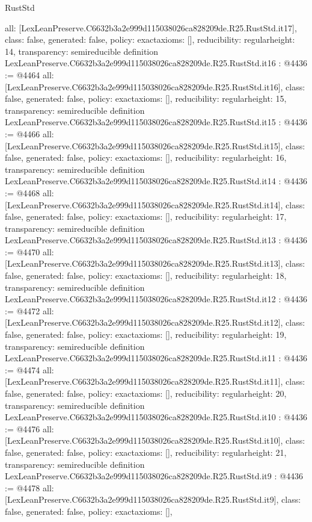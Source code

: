 \begin{lexlean}{RustStd}
\begin{coremodule}
{  all: [LexLeanPreserve.C6632b3a2e999d115038026ca828209de.R25.RustStd.it17],
  class: false,
  generated: false,
  policy: exact{axioms: []},
  reducibility: regular{height: 14},
  transparency: semireducible
}
definition LexLeanPreserve.C6632b3a2e999d115038026ca828209de.R25.RustStd.it16 : @4436 := @4464 {
  all: [LexLeanPreserve.C6632b3a2e999d115038026ca828209de.R25.RustStd.it16],
  class: false,
  generated: false,
  policy: exact{axioms: []},
  reducibility: regular{height: 15},
  transparency: semireducible
}
definition LexLeanPreserve.C6632b3a2e999d115038026ca828209de.R25.RustStd.it15 : @4436 := @4466 {
  all: [LexLeanPreserve.C6632b3a2e999d115038026ca828209de.R25.RustStd.it15],
  class: false,
  generated: false,
  policy: exact{axioms: []},
  reducibility: regular{height: 16},
  transparency: semireducible
}
definition LexLeanPreserve.C6632b3a2e999d115038026ca828209de.R25.RustStd.it14 : @4436 := @4468 {
  all: [LexLeanPreserve.C6632b3a2e999d115038026ca828209de.R25.RustStd.it14],
  class: false,
  generated: false,
  policy: exact{axioms: []},
  reducibility: regular{height: 17},
  transparency: semireducible
}
definition LexLeanPreserve.C6632b3a2e999d115038026ca828209de.R25.RustStd.it13 : @4436 := @4470 {
  all: [LexLeanPreserve.C6632b3a2e999d115038026ca828209de.R25.RustStd.it13],
  class: false,
  generated: false,
  policy: exact{axioms: []},
  reducibility: regular{height: 18},
  transparency: semireducible
}
definition LexLeanPreserve.C6632b3a2e999d115038026ca828209de.R25.RustStd.it12 : @4436 := @4472 {
  all: [LexLeanPreserve.C6632b3a2e999d115038026ca828209de.R25.RustStd.it12],
  class: false,
  generated: false,
  policy: exact{axioms: []},
  reducibility: regular{height: 19},
  transparency: semireducible
}
definition LexLeanPreserve.C6632b3a2e999d115038026ca828209de.R25.RustStd.it11 : @4436 := @4474 {
  all: [LexLeanPreserve.C6632b3a2e999d115038026ca828209de.R25.RustStd.it11],
  class: false,
  generated: false,
  policy: exact{axioms: []},
  reducibility: regular{height: 20},
  transparency: semireducible
}
definition LexLeanPreserve.C6632b3a2e999d115038026ca828209de.R25.RustStd.it10 : @4436 := @4476 {
  all: [LexLeanPreserve.C6632b3a2e999d115038026ca828209de.R25.RustStd.it10],
  class: false,
  generated: false,
  policy: exact{axioms: []},
  reducibility: regular{height: 21},
  transparency: semireducible
}
definition LexLeanPreserve.C6632b3a2e999d115038026ca828209de.R25.RustStd.it9 : @4436 := @4478 {
  all: [LexLeanPreserve.C6632b3a2e999d115038026ca828209de.R25.RustStd.it9],
  class: false,
  generated: false,
  policy: exact{axioms: []},
}
\end{coremodule}
\end{lexlean}
